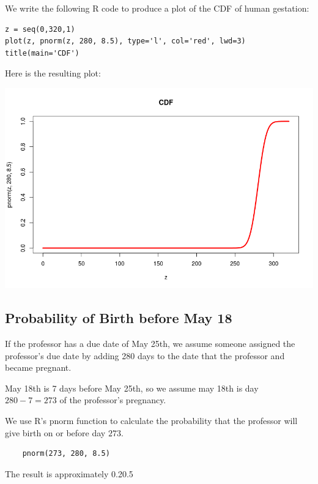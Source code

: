 \documentclass[a4paper,11pt]{article}
\begin{document}
We write the following R code to produce a plot of the CDF of human gestation:

\begin{lstlisting}
z = seq(0,320,1)
plot(z, pnorm(z, 280, 8.5), type='l', col='red', lwd=3)
title(main='CDF')
\end{lstlisting}

Here is the resulting plot:
\begin{center}
\includegraphics[scale=0.5]{cdf-gestation}
\end{center}

\subsection{Probability of Birth before May 18}

If the professor has a due date of May 25th, we assume someone assigned the
professor's due date by adding 280 days to the date that the professor and
became pregnant.

May 18th is 7 days before May 25th, so we assume may 18th is day $280-7=273$
of the professor's pregnancy.

We use R's pnorm function to calculate the probability that the professor will
give birth on or before day $273$.

\begin{lstlisting}
	pnorm(273, 280, 8.5)
\end{lstlisting}

The result is approximately 0.20.5
\printbibliography{}
\end{document}
